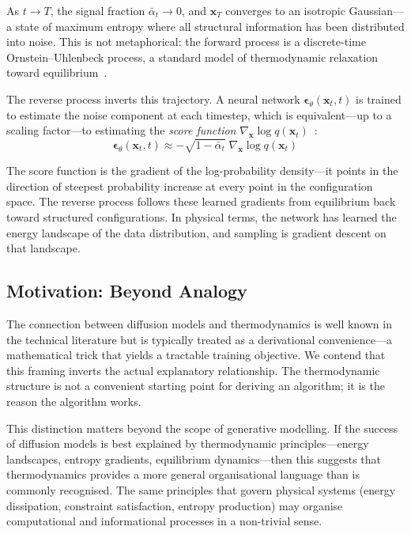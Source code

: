 As $t \to T$, the signal fraction $\bar{\alpha}_t \to 0$, and $\mathbf{x}_T$ converges to an isotropic Gaussian---a state of maximum entropy where all structural information has been distributed into noise. This is not metaphorical: the forward process is a discrete-time Ornstein--Uhlenbeck process, a standard model of thermodynamic relaxation toward equilibrium~\cite{uhlenbeck1930theory}.

The reverse process inverts this trajectory. A neural network $\boldsymbol{\epsilon}_\theta(\mathbf{x}_t, t)$ is trained to estimate the noise component at each timestep, which is equivalent---up to a scaling factor---to estimating the \emph{score function} $\nabla_{\mathbf{x}} \log q(\mathbf{x}_t)$~\cite{vincent2011connection, song2019generative}:
%
\begin{equation}
    \boldsymbol{\epsilon}_\theta(\mathbf{x}_t, t) \approx -\sqrt{1 - \bar{\alpha}_t}\;\nabla_{\mathbf{x}} \log q(\mathbf{x}_t)
    \label{eq:score}
\end{equation}

The score function is the gradient of the log-probability density---it points in the direction of steepest probability increase at every point in the configuration space. The reverse process follows these learned gradients from equilibrium back toward structured configurations. In physical terms, the network has learned the energy landscape of the data distribution, and sampling is gradient descent on that landscape.

\subsection{Motivation: Beyond Analogy}

The connection between diffusion models and thermodynamics is well known in the technical literature but is typically treated as a derivational convenience---a mathematical trick that yields a tractable training objective. We contend that this framing inverts the actual explanatory relationship. The thermodynamic structure is not a convenient starting point for deriving an algorithm; it is the reason the algorithm works.

This distinction matters beyond the scope of generative modelling. If the success of diffusion models is best explained by thermodynamic principles---energy landscapes, entropy gradients, equilibrium dynamics---then this suggests that thermodynamics provides a more general organisational language than is commonly recognised. The same principles that govern physical systems (energy dissipation, constraint satisfaction, entropy production) may organise computational and informational processes in a non-trivial sense.

